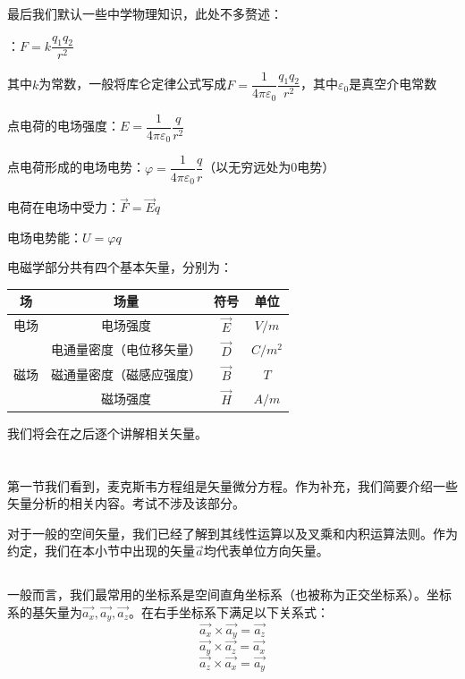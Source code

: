 最后我们默认一些中学物理知识，此处不多赘述：
\begin{Itemize}
    \item {}：$F=k\dfrac{q_1 q_2}{r^2}$
    
    其中$k$为常数，一般将库仑定律公式写成$F=\dfrac{1}{4\pi\varepsilon_0}\dfrac{q_1 q_2}{r^2}$，其中$\varepsilon_0$是真空介电常数
    \item 点电荷的电场强度：$E=\dfrac{1}{4\pi\varepsilon_0}\dfrac{q}{r^2}$
    \item 点电荷形成的电场电势：$\varphi=\dfrac{1}{4\pi\varepsilon_0}\dfrac{q}{r}$（以无穷远处为0电势）
    \item 电荷在电场中受力：$\vec{F}=\vec{E}q$
    \item 电场电势能：$U=\varphi q$
\end{Itemize}

电磁学部分共有四个基本矢量，分别为：
\begin{table}[!ht]
    \centering
    \begin{tabular}{cccc}
    \toprule
        场 & 场量 & 符号 & 单位 \\
    \midrule
        电场 & 电场强度 & \(\vec{E}\) & \(V/m\) \\
        & 电通量密度（电位移矢量） & \(\vec{D}\) & \(C/m^2\) \\ 
        磁场 & 磁通量密度（磁感应强度） & \(\vec{B}\) & \(T\) \\
        & 磁场强度 & \(\vec{H}\) & \(A/m\) \\
    \bottomrule
    \end{tabular}
\end{table}

我们将会在之后逐个讲解相关矢量。
\section[矢量分析基础*]{}
第一节我们看到，麦克斯韦方程组是矢量微分方程。作为补充，我们简要介绍一些矢量分析的相关内容。考试不涉及该部分。

对于一般的空间矢量，我们已经了解到其线性运算以及叉乘和内积运算法则。作为约定，我们在本小节中出现的矢量$\vec{a}$均代表单位方向矢量。
\subsection[空间坐标系]{}
一般而言，我们最常用的坐标系是空间直角坐标系（也被称为正交坐标系）。坐标系的基矢量为$\vec{a_x},\vec{a_y},\vec{a_z}$。在右手坐标系下满足以下关系式：
\[\vec{a_x}\times\vec{a_y}=\vec{a_z}\]
\[\vec{a_y}\times\vec{a_z}=\vec{a_x}\]
\[\vec{a_z}\times\vec{a_x}=\vec{a_y}\]

